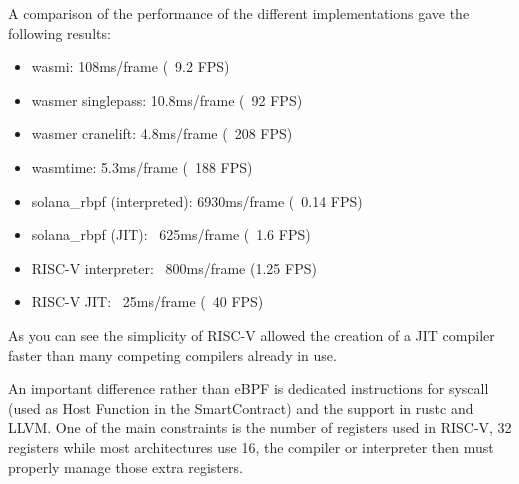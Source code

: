 A comparison of the performance of the different implementations gave the following results:
\begin{itemize}
    \item wasmi: 108ms/frame (~9.2 FPS)
    \item wasmer singlepass: 10.8ms/frame (~92 FPS)
    \item wasmer cranelift: 4.8ms/frame (~208 FPS)
    \item wasmtime: 5.3ms/frame (~188 FPS)
    \item solana\_rbpf (interpreted): 6930ms/frame (~0.14 FPS)
    \item solana\_rbpf (JIT): ~625ms/frame (~1.6 FPS)
    \item RISC-V interpreter: ~800ms/frame (1.25 FPS)
    \item RISC-V JIT: ~25ms/frame (~40 FPS)
\end{itemize}

As you can see the simplicity of RISC-V allowed the creation of a JIT compiler faster than many competing compilers already in use.

An important difference rather than eBPF is dedicated instructions for syscall (used as Host Function in the SmartContract) and the support in rustc and LLVM. One of the main constraints is the number of registers used in RISC-V, 32 registers while most architectures use 16, the compiler or interpreter then must properly manage those extra registers.
